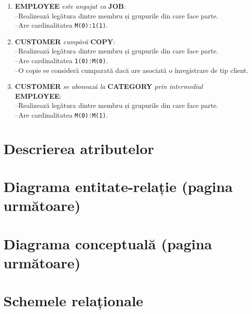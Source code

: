 \documentclass[a4paper,oneside, 12pt]{article}
\begin{document}
\begin{enumerate}[label=\roman*.]
        \item \textbf{EMPLOYEE} \emph{este angajat ca} \textbf{JOB}:
                \\--Realizează legătura dintre membru și grupurile din care face parte.
                \\--Are cardinalitatea {\texttt{M(0):1(1)}.}

        \item \textbf{CUSTOMER} \emph{cumpără} \textbf{COPY}:
                \\--Realizează legătura dintre membru și grupurile din care face parte.
                \\--Are cardinalitatea {\texttt{1(0):M(0)}.}
                \\--O copie se consideră cumparată dacă are asociată o înregistrare de tip client.

        \item \textbf{CUSTOMER} \emph{se abonează la} \textbf{CATEGORY} \emph{prin intermediul} \textbf{EMPLOYEE}:
                \\--Realizează legătura dintre membru și grupurile din care face parte.
                \\--Are cardinalitatea {\texttt{M(0):M(1)}.}

\end{enumerate}

\section{Descrierea atributelor}

\section{Diagrama entitate-relație (pagina următoare)}



\section{Diagrama conceptuală (pagina următoare)}



\section{Schemele relaționale}

\begin{center}



\end{center}
\end{document}
